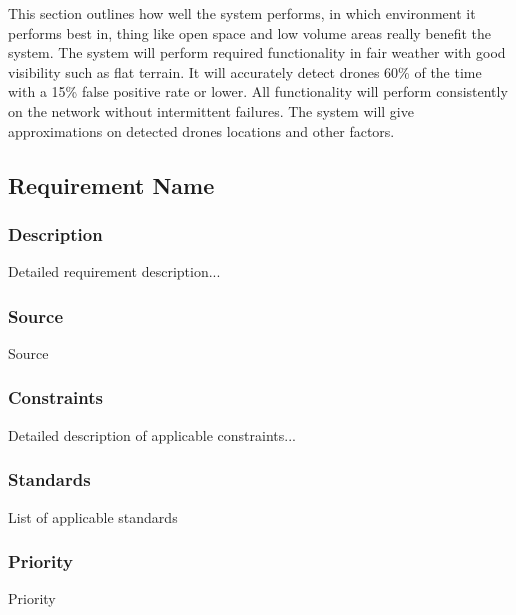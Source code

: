 This section outlines how well the system performs, in which environment it performs best in, thing like open space and low volume areas really benefit the system.  The system will perform required functionality in fair weather with good visibility such as flat terrain. It will accurately detect drones 60\% of the time with a 15\% false positive rate or lower. All functionality will perform consistently on the network without intermittent failures. The system will give approximations on detected drones locations and other factors.

\subsection{Requirement Name}
\subsubsection{Description}
Detailed requirement description...
\subsubsection{Source}
Source
\subsubsection{Constraints}
Detailed description of applicable constraints...
\subsubsection{Standards}
List of applicable standards
\subsubsection{Priority}
Priority